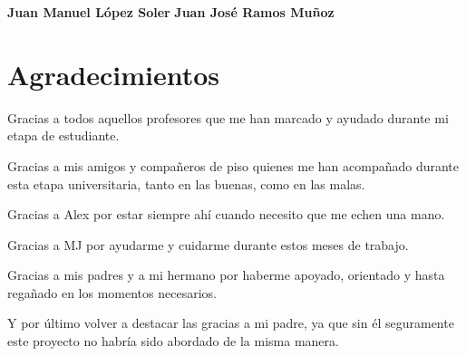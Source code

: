 \noindent \textbf{Juan Manuel López Soler} \hspace{3.5cm} \textbf{Juan José Ramos Muñoz}

\chapter*{Agradecimientos}

Gracias a todos aquellos profesores que me han marcado y ayudado durante mi etapa de estudiante.

Gracias a mis amigos y compañeros de piso quienes me han acompañado durante esta etapa universitaria, tanto en las buenas, como en las malas.

Gracias a Alex por estar siempre ahí cuando necesito que me echen una mano.

Gracias a MJ por ayudarme y cuidarme durante estos meses de trabajo.

Gracias a mis padres y a mi hermano por haberme apoyado, orientado y hasta regañado en los momentos necesarios.

Y por último volver a destacar las gracias a mi padre, ya que sin él seguramente este proyecto no habría sido abordado de la misma manera.